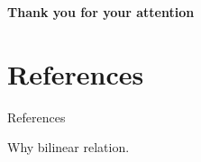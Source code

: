 \documentclass{beamer}
\begin{document}
\begin{frame}
  \centering \Large
  \textbf{{Thank you for your attention}}
\end{frame}

\section*{References}
\begin{frame}[allowframebreaks]{References}
\scriptsize
\printbibliography
\end{frame}

\begin{frame}
  Why bilinear relation.

\end{frame}
\end{document}
